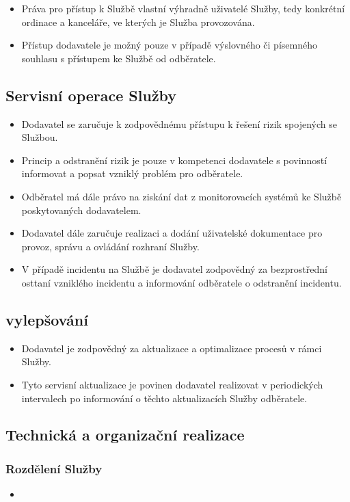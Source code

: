 \documentclass[11pt, a4paper, titlepage]{article}
\begin{document}
	\begin{itemize}
		\item Práva pro přístup k Službě vlastní výhradně uživatelé Služby, tedy konkrétní ordinace a kanceláře, ve kterých je Služba provozována.
		\item Přístup dodavatele je možný pouze v případě výslovného či písemného souhlasu s přístupem ke Službě od odběratele.
	\end{itemize}

	\subsection*{Servisní operace Služby}

	\begin{itemize}
		\item Dodavatel se zaručuje k zodpovědnému přístupu k řešení rizik spojených se Službou.
		\item Princip a odstranění rizik je pouze v kompetenci dodavatele s povinností informovat a popsat vzniklý problém pro odběratele.
		\item Odběratel má dále právo na ziskání dat z monitorovacích systémů ke Službě poskytovaných dodavatelem.
		\item Dodavatel dále zaručuje realizaci a dodání uživatelské dokumentace pro provoz, správu a ovládání rozhraní Služby.
		\item V případě incidentu na Službě je dodavatel zodpovědný za bezprostřední osttaní vzniklého incidentu a informování odběratele o odstranění incidentu.
	\end{itemize}

	\subsection*{vylepšování}

	\begin{itemize}
		\item Dodavatel je zodpovědný za aktualizace a optimalizace procesů v rámci Služby.
		\item Tyto servisní aktualizace je povinen dodavatel realizovat v periodických intervalech po informování o těchto aktualizacích Služby odběratele.  
	\end{itemize}

	\subsection*{Technická a organizační realizace}

	\subsubsection*{Rozdělení Služby}

	\begin{itemize}
		\item 
	\end{itemize}
\end{document}
